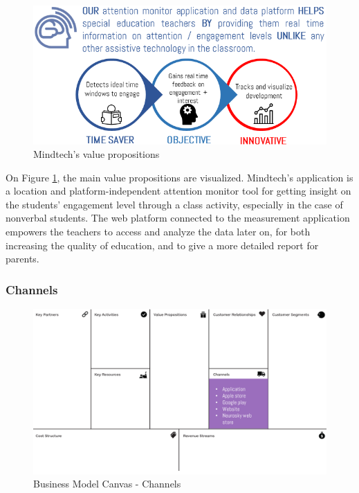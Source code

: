 \documentclass[letterpaper,10pt]{article}
\begin{document}
\begin{figure}[!htb]
\centering
\includegraphics[scale=0.5]{valueprop.PNG}
\caption{\label{img:valprop}Mindtech's value propositions}
\end{figure}

On Figure \ref{img:valprop}, the main value propositions are  visualized. Mindtech's application is a location and platform-independent attention monitor tool for getting insight on the students’ engagement level through a class activity, especially in the case of nonverbal students. The web platform connected to the measurement application empowers the teachers to access and analyze the data later on, for both increasing the quality of education, and to give a more detailed report for parents. 




\subsubsection{Channels}

\begin{figure}[!htb]
\centering
\includegraphics[scale=0.5]{channel.PNG}
\caption{Business Model Canvas - Channels}
\label{img:BMC_channels}
\end{figure}
\end{document}
